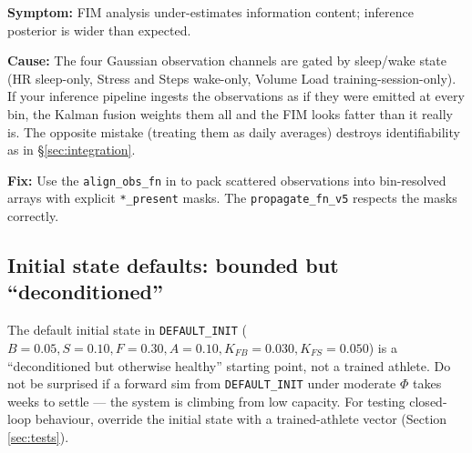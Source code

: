 \documentclass[11pt,a4paper]{article}
\theoremstyle{definition}
\begin{document}
\textbf{Symptom:} FIM analysis under-estimates information content;
inference posterior is wider than expected.

\textbf{Cause:} The four Gaussian observation channels are gated by
sleep/wake state (HR sleep-only, Stress and Steps wake-only, Volume
Load training-session-only). If your inference pipeline ingests the
observations as if they were emitted at every bin, the Kalman fusion
weights them all and the FIM looks fatter than it really is. The
opposite mistake (treating them as daily averages) destroys
identifiability as in §\ref{sec:integration}.

\textbf{Fix:} Use the \texttt{align\_obs\_fn} in
 to pack scattered observations into
bin-resolved arrays with explicit \texttt{*\_present} masks. The
\texttt{propagate\_fn\_v5} respects the masks correctly.

\subsection{Initial state defaults: bounded but ``deconditioned''}

The default initial state in \texttt{DEFAULT\_INIT}
($B = 0.05, S = 0.10, F = 0.30, A = 0.10, K_{FB} = 0.030, K_{FS} =
0.050$) is a ``deconditioned but otherwise healthy'' starting point,
not a trained athlete. Do not be surprised if a forward sim from
\texttt{DEFAULT\_INIT} under moderate $\Phi$ takes weeks to settle ---
the system is climbing from low capacity. For testing closed-loop
behaviour, override the initial state with a trained-athlete vector
(Section \ref{sec:tests}).



\end{document}
